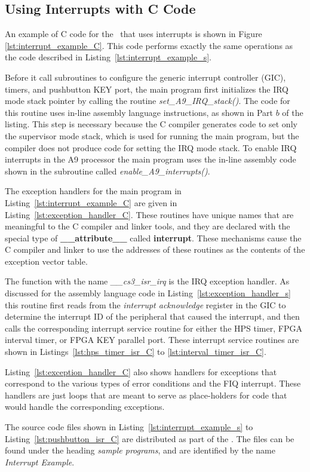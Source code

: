 \subsection{Using Interrupts with C Code}

An example of C code for the \systemName~that uses interrupts is
shown in Figure \ref{lst:interrupt_example_C}. This code performs exactly the same
operations as the code described in Listing~\ref{lst:interrupt_example_s}. 

Before it call subroutines to configure the generic interrupt controller (GIC), timers,
and pushbutton KEY port, the main program first initializes the IRQ mode stack pointer by
calling the routine {\it set\_A9\_IRQ\_stack()}. The code for this routine uses in-line
assembly language instructions, as shown in Part $b$ of the listing. This step is necessary 
because the C compiler generates code to set only the supervisor mode stack, which is used 
for running the main program, but the compiler does not produce code for setting
the IRQ mode stack.  To enable IRQ interrupts in the A9 processor the main program uses
the in-line assembly code shown in the subroutine called {\it enable\_A9\_interrupts()}.

The exception handlers for the main program in Listing~\ref{lst:interrupt_example_C} 
are given in Listing~\ref{lst:exception_handler_C}. These routines have unique names that
are meaningful to the C compiler and linker tools, and they are declared with the special
type of {\bf \_\_attribute\_\_} called {\bf interrupt}. These mechanisms cause the C
compiler and linker to use the addresses of these routines as the contents of the exception
vector table.

The function with the name {\it \_\_cs3\_isr\_irq} is the IRQ exception handler. As
discussed for the assembly language code in Listing~\ref{lst:exception_handler_s} this 
routine first reads from the {\it interrupt acknowledge} register in the GIC to determine 
the interrupt ID of the peripheral that caused the interrupt, and then 
calls the corresponding interrupt service routine for either the HPS timer, FPGA interval timer,
or FPGA KEY parallel port.  These interrupt service routines are shown in 
Listings~\ref{lst:hps_timer_isr_C} to \ref{lst:interval_timer_isr_C}.

Listing~\ref{lst:exception_handler_C} also shows handlers for exceptions that correspond to 
the various types of error conditions and the FIQ interrupt. These handlers are just loops
that are meant to serve as place-holders for code that would handle the corresponding
exceptions. 

The source code files shown in Listing~\ref{lst:interrupt_example_s} to
Listing~\ref{lst:pushbutton_isr_C} are distributed as part of the  
\productNameMed{}. The files can be found under the heading {\it sample programs}, 
and are identified by the name {\it Interrupt Example}.


